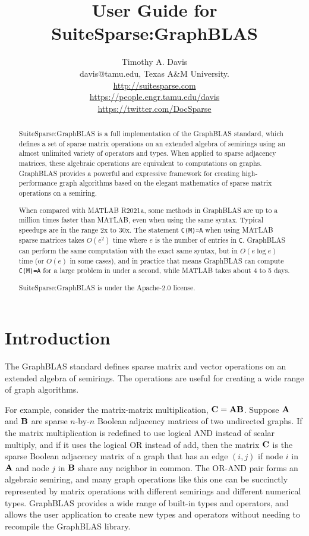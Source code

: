 \documentclass[12pt]{article}
\title{User Guide for SuiteSparse:GraphBLAS}
\author{Timothy A. Davis \\
\small
davis@tamu.edu, Texas A\&M University. \\
\small
\url{http://suitesparse.com} \\
\small
\url{https://people.engr.tamu.edu/davis} \\
\small
\url{https://twitter.com/DocSparse}
}
\begin{document}
\maketitle

\begin{abstract}
SuiteSparse:GraphBLAS is a full implementation of the GraphBLAS standard,
which defines a set of sparse matrix operations on an extended algebra of
semirings using an almost unlimited variety of operators and types.  When
applied to sparse adjacency matrices, these algebraic operations are equivalent
to computations on graphs.  GraphBLAS provides a powerful and expressive
framework for creating high-performance graph algorithms based on the elegant
mathematics of sparse matrix operations on a semiring.

When compared with MATLAB R2021a, some methods in GraphBLAS are up to
a million times faster than MATLAB, even when using the same syntax.
Typical speedups are in the range 2x to 30x.
The statement \verb'C(M)=A' when using MATLAB sparse matrices takes
$O(e^2)$ time where $e$ is the number of entries in \verb'C'.  GraphBLAS
can perform the same computation with the exact same syntax, but
in $O(e \log e)$ time (or $O(e)$ in some cases), and in practice that
means GraphBLAS can compute \verb'C(M)=A' for a large problem in under
a second, while MATLAB takes about 4 to 5 days.

SuiteSparse:GraphBLAS is under the Apache-2.0 license.

\end{abstract}

\newpage
{\small
\tableofcontents
}

\newpage
\section{Introduction} %
\label{intro}

The GraphBLAS standard defines sparse matrix and vector operations on an
extended algebra of semirings.  The operations are useful for creating a wide
range of graph algorithms.

For example, consider the matrix-matrix multiplication, ${\bf C=AB}$.  Suppose
${\bf A}$ and ${\bf B}$ are sparse $n$-by-$n$ Boolean adjacency matrices of two
undirected graphs.  If the matrix multiplication is redefined to use logical
AND instead of scalar multiply, and if it uses the logical OR instead of add,
then the matrix ${\bf C}$ is the sparse Boolean adjacency matrix of a graph
that has an edge $(i,j)$ if node $i$ in ${\bf A}$ and node $j$ in ${\bf B}$
share any neighbor in common.  The OR-AND pair forms an algebraic semiring, and
many graph operations like this one can be succinctly represented by matrix
operations with different semirings and different numerical types.  GraphBLAS
provides a wide range of built-in types and operators, and allows the user
application to create new types and operators without needing to recompile the
GraphBLAS library.
\end{document}
